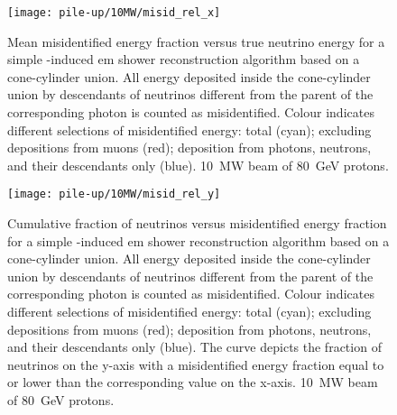 \begin{figure}[tbp]
	\centering
	\texttt{[image: pile-up/10MW/misid\_rel\_x]}
	\caption[Pile-up study mean misidentified fractional vs.\ true neutrino energy, \SI{10}{\mega\watt} beam]{%
		Mean misidentified energy fraction versus true neutrino energy for a simple \Pgpz-induced \acrshort{em} shower reconstruction algorithm based on a cone-cylinder union.
		All energy deposited inside the cone-cylinder union by descendants of neutrinos different from the parent of the corresponding \Pgpz photon is counted as misidentified.
		Colour indicates different selections of misidentified energy: total (cyan); excluding depositions from muons (red); deposition from photons, neutrons, and their descendants only (blue).
		\SI{10}{\mega\watt} beam of \SI{80}{\giga\electronvolt} protons.
	}
\end{figure}

\begin{figure}[tbp]
	\centering
	\texttt{[image: pile-up/10MW/misid\_rel\_y]}
	\caption[Pile-up study neutrino vs.\ misidentified energy fraction, \SI{10}{\mega\watt} beam]{%
		Cumulative fraction of neutrinos versus misidentified energy fraction for a simple \Pgpz-induced \acrshort{em} shower reconstruction algorithm based on a cone-cylinder union.
		All energy deposited inside the cone-cylinder union by descendants of neutrinos different from the parent of the corresponding \Pgpz photon is counted as misidentified.
		Colour indicates different selections of misidentified energy: total (cyan); excluding depositions from muons (red); deposition from photons, neutrons, and their descendants only (blue).
		The curve depicts the fraction of neutrinos on the y-axis with a misidentified energy fraction equal to or lower than the corresponding value on the x-axis.
		\SI{10}{\mega\watt} beam of \SI{80}{\giga\electronvolt} protons.
	}
\end{figure}